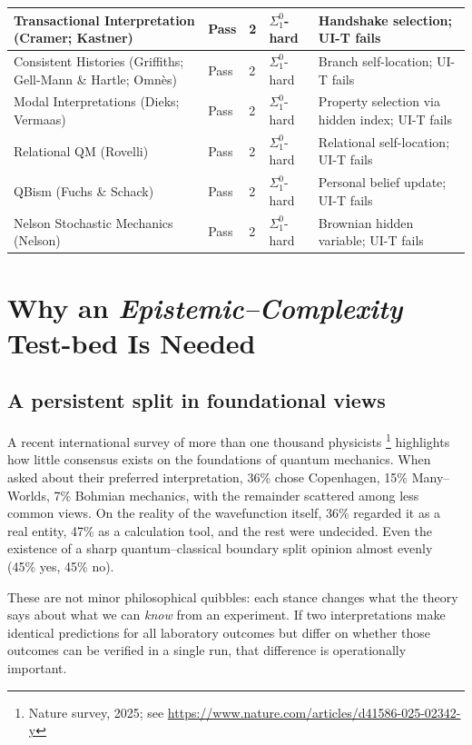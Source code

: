 \documentclass[12pt]{article}
\theoremstyle{definition}
\theoremstyle{plain}
\begin{document}
\begin{table}[ht]
\begin{tabular*}{\textwidth}{|p{7cm}|p{1.5cm}|p{1cm}|p{2cm}|p{4.5cm}|}
\hline
Transactional Interpretation (Cramer; Kastner) & Pass & 2 &  \(\Sigma^0_1\)-hard & Handshake selection; UI-T fails \\
\hline
Consistent Histories (Griffiths; Gell-Mann \& Hartle; Omnès) & Pass & 2 &  \(\Sigma^0_1\)-hard & Branch self-location; UI-T fails \\
\hline
Modal Interpretations (Dieks; Vermaas) & Pass & 2 &  \(\Sigma^0_1\)-hard & Property selection via hidden index; UI-T fails \\
\hline
Relational QM (Rovelli) & Pass & 2 &  \(\Sigma^0_1\)-hard & Relational self-location; UI-T fails \\
\hline
QBism (Fuchs \& Schack) & Pass & 2 &  \(\Sigma^0_1\)-hard & Personal belief update; UI-T fails \\
\hline
Nelson Stochastic Mechanics (Nelson) & Pass & 2 &  \(\Sigma^0_1\)-hard & Brownian hidden variable; UI-T fails \\
\hline
\end{tabular*}
\end{table}


\section{Why an \emph{Epistemic--Complexity} Test-bed Is Needed}

\subsection{A persistent split in foundational views}
A recent international survey of more than one thousand physicists%
\footnote{Nature survey, 2025; see \url{https://www.nature.com/articles/d41586-025-02342-y}} 
highlights how little consensus exists on the foundations of quantum mechanics.  
When asked about their preferred interpretation, 36\% chose Copenhagen,  
15\% Many--Worlds, 7\% Bohmian mechanics, with the remainder scattered among  
less common views.  On the reality of the wavefunction itself,  
36\% regarded it as a real entity, 47\% as a calculation tool, and the rest were undecided.  
Even the existence of a sharp quantum--classical boundary split opinion almost evenly (45\% yes, 45\% no).  

These are not minor philosophical quibbles: each stance changes what the theory says about 
what we can \emph{know} from an experiment.  
If two interpretations make identical predictions for all laboratory outcomes but differ 
on whether those outcomes can be verified in a single run,  
that difference is operationally important.
\end{document}
